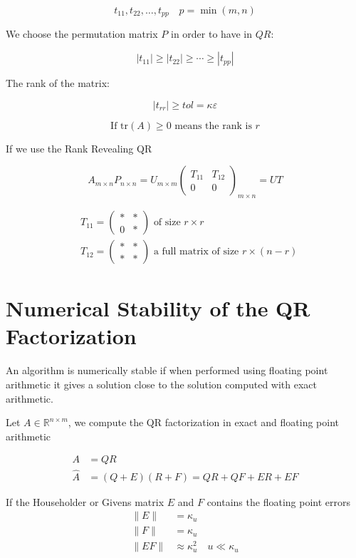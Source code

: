 \[
t_{11}, t_{22}, \ldots, t_{pp} \quad p = \min(m, n)
\]

We choose the permutation matrix \( P \) in order to have in \( QR \):

\[
|t_{11}| \geq |t_{22}| \geq \cdots \geq |t_{pp}|
\]

The rank of the matrix:

\[
|t_{rr}| \geq tol = \kappa\varepsilon
\]


\[
\text{If } \text{tr}(A) \geq 0 \text{ means the rank is } r
\]

If we use the Rank Revealing QR

\[
A_{m \times n} P_{n \times n} = U_{m \times m} \begin{pmatrix}
T_{11} & T_{12} \\
0 & 0
\end{pmatrix}_{m \times n} = U T
\]

\[
\begin{aligned}
&T_{11} = \begin{pmatrix}
\ast & \ast \\
0 & \ast
\end{pmatrix} \text{ of size } r \times r \\
&T_{12} = \begin{pmatrix}
\ast & \ast \\
\ast & \ast
\end{pmatrix} \text{ a full matrix} \text{ of size } r \times (n-r)
\end{aligned}
\]

\section{Numerical Stability of the QR Factorization}





An algorithm is numerically stable if when performed using floating point arithmetic it gives a solution close to the solution computed with exact arithmetic.

Let $A \in \mathbb{R}^{n \times m}$, we compute the QR factorization in exact and floating point arithmetic

\begin{align*}
A &= QR \quad \\
\hat{A} &= (Q+E)(R+F) = QR + QF + ER + EF
\end{align*}

If the Householder or Givens matrix $E$ and $F$ contains the floating point errors
\begin{align*}
\|E\| &= \kappa_u \\
\|F\| &= \kappa_u \\
\|EF\| &\approx \kappa_u^2 \quad u \ll \kappa_u
\end{align*}

